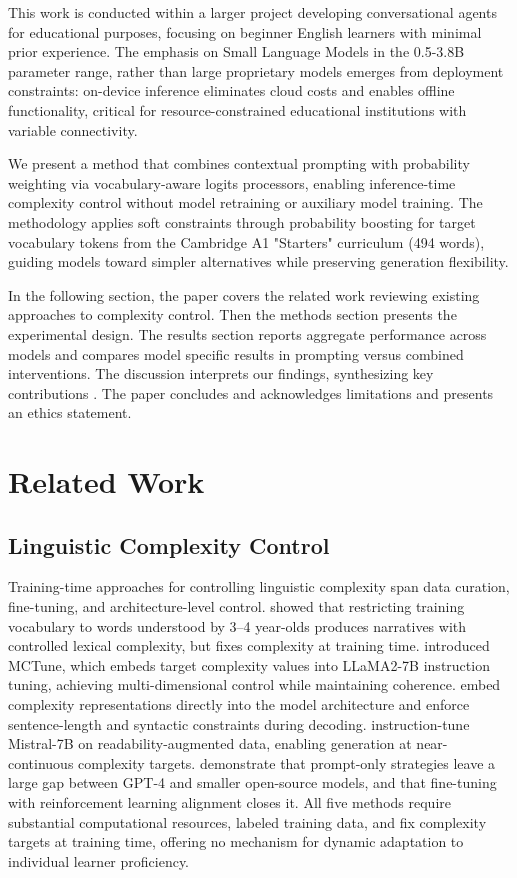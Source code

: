 \documentclass[10pt, a4paper]{article}
\begin{document}
This work is conducted within a larger project developing conversational agents for educational purposes, focusing on beginner English learners with minimal prior experience. The emphasis on Small Language Models \cite{fang2024survey} in the 0.5-3.8B parameter range, rather than large proprietary models emerges from deployment constraints: on-device inference eliminates cloud costs and enables offline functionality, critical for resource-constrained educational institutions with variable connectivity.

We present a method that combines contextual prompting with probability weighting via vocabulary-aware logits processors, enabling inference-time complexity control without model retraining or auxiliary model training. The methodology applies soft constraints through probability boosting for target vocabulary tokens from the Cambridge A1 "Starters" curriculum (494 words), guiding models toward simpler alternatives while preserving generation flexibility.

In the following section, the paper covers the related work reviewing existing approaches to complexity control. Then the methods section presents the experimental design. The results section reports aggregate performance across models and compares model specific results in prompting versus combined interventions. The discussion interprets our findings, synthesizing key contributions . The paper concludes and acknowledges limitations and presents an ethics statement.


\section{Related Work}

\subsection{Linguistic Complexity Control}

Training-time approaches for controlling linguistic complexity span data curation, fine-tuning,
and architecture-level control.
\citet{eldan2023tinystories} showed that restricting training vocabulary to words understood
by 3--4 year-olds produces narratives with controlled lexical complexity, but fixes complexity
at training time.
\citet{nguyen2024multi} introduced MCTune, which embeds target complexity values into LLaMA2-7B
instruction tuning, achieving multi-dimensional control while maintaining coherence.
\citet{nie2023lexical} embed complexity representations directly into the model architecture and
enforce sentence-length and syntactic constraints during decoding.
\citet{tran2024readctrl} instruction-tune Mistral-7B on readability-augmented data, enabling
generation at near-continuous complexity targets.
\citet{malik2024tarzan} demonstrate that prompt-only strategies leave a large gap between GPT-4
and smaller open-source models, and that fine-tuning with reinforcement learning alignment
closes it.
All five methods require substantial computational resources, labeled training data, and fix
complexity targets at training time, offering no mechanism for dynamic adaptation to individual
learner proficiency.\textbf{}
\end{document}
